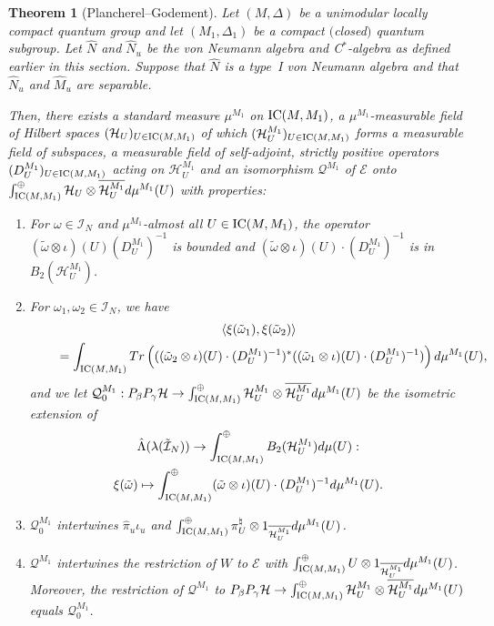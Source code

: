 \documentclass[11pt]{article}
\numberwithin{equation}{section}
\newtheorem{thm}{Theorem}[section]
\theoremstyle{definition}
\newcommand{\cHil}{\mathcal{H}}
\newcommand{\ICMM}{\text{\rm IC}(M, M_1)}
\begin{document}
\begin{thm}[Plancherel--Godement]\label{ThmPG}
Let $(M, \Delta)$ be a unimodular locally compact quantum group and let $(M_1, \Delta_1)$ be a compact $($closed$)$ quantum subgroup. Let $\hat{N}$ and $\hat{N}_u$ be the von Neumann algebra and C$^\ast$-algebra as defined earlier in this section. Suppose that $\hat{N}$ is a type~I von Neumann algebra and that $\hat{N}_u$ and $\hat{M}_u$ are separable.

Then, there exists a standard measure $\mu^{M_1}$ on $\ICMM$, a $\mu^{M_1}$-measurable field of Hilbert spaces $(\cHil_U)_{U \in \ICMM}$ of which $(\cHil_U^{M_1})_{U \in \ICMM}$ forms a measurable field of subspaces, a measurable field  of self-adjoint, strictly positive operators $(D_U^{M_1})_{U \in \ICMM}$ acting on $\cHil_U^{M_1}$ and an isomorphism $\mathcal{Q}^{M_1}$ of $\mathcal{E}$ onto $\int^\oplus_{\ICMM} \cHil_U \otimes \overline{ \cHil_U^{M_1}} d\mu^{M_1}(U)$ with properties:
\begin{enumerate}\itemsep=0pt

\item\label{ItemPGOne} For $\omega \in \mathcal{I}_N$ and $\mu^{M_1}$-almost all $U \in \ICMM$, the operator $(\tilde{\omega} \otimes \iota)(U)  (D_U^{M_1})^{-1}$ is bounded and $(\tilde{\omega} \otimes \iota )(U) \cdot (D_U^{M_1})^{-1}$ is in $B_2( \cHil_U^{M_1})$.
\item\label{ItemPGTwoA} For $\omega_1, \omega_2 \in \mathcal{I}_N$, we have
\begin{gather*}
\langle \xi(\tilde{\omega}_1),  \xi(\tilde{\omega}_2) \rangle\\
\qquad{} =
\int_{\ICMM} {\rm Tr} \left( ( ( \tilde{\omega}_2 \otimes \iota)(U) \cdot (D_U^{M_1})^{-1} )^{\ast}( ( \tilde{\omega}_1 \otimes \iota)(U) \cdot (D_U^{M_1})^{-1}) \right) d\mu^{M_1}(U),
\end{gather*}
and we let $\mathcal{Q}_0^{M_1}: P_\beta P_\gamma \cHil \rightarrow \int^\oplus_{\ICMM} \cHil_U^{M_1} \otimes \overline{\cHil_U^{M_1}} d\mu^{M_1}(U)$ be the isometric extension of
\begin{gather*}
\hat{\Lambda}(\lambda(\tilde{\mathcal{I}}_N)) \rightarrow \int_{\ICMM}^\oplus B_2 (\cHil_U^{M_1})d\mu(U): \\ \xi(\tilde{\omega}) \mapsto \int^\oplus_{\ICMM} (\tilde{\omega} \otimes \iota)(U) \cdot (D_U^{M_1})^{-1} d\mu^{M_1}(U).
\end{gather*}
\item\label{ItemPGTwoB}
 $\mathcal{Q}_0^{M_1}$ intertwines $\hat{\pi}_{u} \iota_u$ and $\int_{\ICMM}^\oplus  \pi_U^\natural \otimes 1_{ \overline{ \cHil_U^{M_1}}} d\mu^{M_1}(U)$.

\item\label{ItemPGThree}
$\mathcal{Q}^{M_1}$ intertwines the restriction of $W$ to $\mathcal{E}$ with $\int^\oplus_{\ICMM}  U \otimes 1_{\overline{\cHil_U^{M_1}}}d\mu^{M_1}(U)$. Moreover, the restriction of $\mathcal{Q}^{M_1}$ to $P_\beta P_\gamma \cHil \rightarrow \int^\oplus_{\ICMM}  \cHil_U^{M_1} \otimes \overline{\cHil_U^{M_1}} d\mu^{M_1}(U)$ equals $\mathcal{Q}^{M_1}_0$.
\end{enumerate}
\end{thm}
\end{document}
